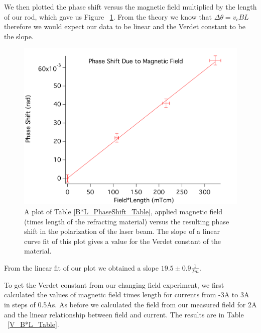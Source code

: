 \documentclass[prb,preprint]{revtex4-1}
\begin{document}
We then plotted the phase shift versus the magnetic field multiplied by the length of our rod, which gave us Figure ~\ref{PhaseShift_B*L_Plot}. From the theory we know that $\Delta \theta = v_c B L$ therefore we would expect our data to be linear and the Verdet constant to be the slope.

\begin{figure}[h!]
\centering
\includegraphics[width=5in]{PhaseShift_B-L_Plot.pdf}
\caption{A plot of Table \ref{B*L_PhaseShift_Table}, applied magnetic field (times length of the refracting material) versus the resulting phase shift in the polarization of the laser beam. The slope of a linear curve fit of this plot gives a value for the Verdet constant of the material. }
\label{PhaseShift_B*L_Plot}
\end{figure}

From the linear fit of our plot we obtained a slope $19.5 \pm0.9 \frac{1}{Tm}$.

To get the Verdet constant from our changing field experiment, we first calculated the values of magnetic field times length for currents from -3A to 3A in steps of 0.5As. As before we calculated the field from our measured field for 2A and the linear relationship between field and current. The results are in Table ~\ref{V_B*L_Table}. 
\end{document}
